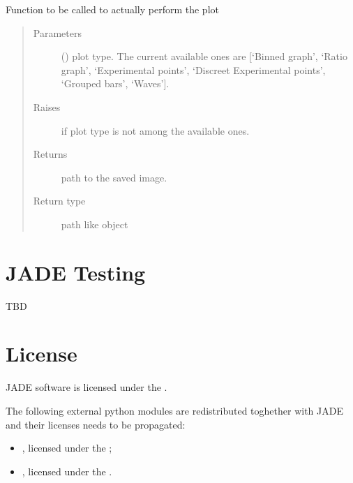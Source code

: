 \documentclass[letterpaper,10pt,english]{sphinxmanual}
\begin{document}
\begin{fulllineitems}
\begin{fulllineitems}
\label{\detokenize{api/postprocessing:plotter.Plotter.plot}}
Function to be called to actually perform the plot
\begin{quote}\begin{description}
\item[{Parameters}] \leavevmode
{} () \textendash{} plot type. The current available ones are {[}‘Binned graph’,
‘Ratio graph’, ‘Experimental points’,
‘Discreet Experimental points’, ‘Grouped bars’, ‘Waves’{]}.

\item[{Raises}] \leavevmode
{} \textendash{} if plot type is not among the available ones.

\item[{Returns}] \leavevmode
{} \textendash{} path to the saved image.

\item[{Return type}] \leavevmode
path like object

\end{description}\end{quote}

\end{fulllineitems}


\end{fulllineitems}



\chapter{JADE Testing}
\label{\detokenize{testing/testing:jade-testing}}\label{\detokenize{testing/testing::doc}}
TBD


\chapter{License}
\label{\detokenize{LICENSE:license}}\label{\detokenize{LICENSE::doc}}
JADE software is licensed under the {\hyperref[\detokenize{LICENSE:gnulicense}]{}}.

The following external python modules are re\sphinxhyphen{}distributed toghether with
JADE and their licenses needs to be propagated:
\begin{itemize}
\item {} 
, licensed under the {\hyperref[\detokenize{LICENSE:gnulicense}]{}};

\item {} 
, licensed under the {\hyperref[\detokenize{LICENSE:pynelicense}]{}}.

\end{itemize}
\end{document}
